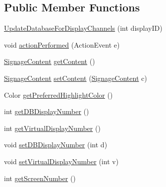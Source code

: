 \subsection*{Public Member Functions}
\begin{DoxyCompactItemize}
\item 
\hyperlink{classgov_1_1fnal_1_1ppd_1_1dd_1_1display_1_1client_1_1UpdateDatabaseForDisplayChannels_a66161ae3d778923070b8e76e261b8919}{Update\-Database\-For\-Display\-Channels} (int display\-I\-D)
\item 
void \hyperlink{classgov_1_1fnal_1_1ppd_1_1dd_1_1display_1_1client_1_1UpdateDatabaseForDisplayChannels_afca6ea4cce3f74bfb0234d7a64df3128}{action\-Performed} (Action\-Event e)
\item 
\hyperlink{interfacegov_1_1fnal_1_1ppd_1_1dd_1_1signage_1_1SignageContent}{Signage\-Content} \hyperlink{classgov_1_1fnal_1_1ppd_1_1dd_1_1display_1_1client_1_1UpdateDatabaseForDisplayChannels_ad4db53bb973088f68a06f874256e4225}{get\-Content} ()
\item 
\hyperlink{interfacegov_1_1fnal_1_1ppd_1_1dd_1_1signage_1_1SignageContent}{Signage\-Content} \hyperlink{classgov_1_1fnal_1_1ppd_1_1dd_1_1display_1_1client_1_1UpdateDatabaseForDisplayChannels_a6fd26afda65661aeed0154a9985e3225}{set\-Content} (\hyperlink{interfacegov_1_1fnal_1_1ppd_1_1dd_1_1signage_1_1SignageContent}{Signage\-Content} c)
\item 
Color \hyperlink{classgov_1_1fnal_1_1ppd_1_1dd_1_1display_1_1client_1_1UpdateDatabaseForDisplayChannels_a0935cd1139a69a4a554edf57dba26879}{get\-Preferred\-Highlight\-Color} ()
\item 
int \hyperlink{classgov_1_1fnal_1_1ppd_1_1dd_1_1display_1_1client_1_1UpdateDatabaseForDisplayChannels_a33565e806ad51bbfd459d1aded545e6a}{get\-D\-B\-Display\-Number} ()
\item 
int \hyperlink{classgov_1_1fnal_1_1ppd_1_1dd_1_1display_1_1client_1_1UpdateDatabaseForDisplayChannels_ad84614dc11788234e7f7dfedde8506dc}{get\-Virtual\-Display\-Number} ()
\item 
void \hyperlink{classgov_1_1fnal_1_1ppd_1_1dd_1_1display_1_1client_1_1UpdateDatabaseForDisplayChannels_a316be5caadb9b6d95d4e7c3264472da1}{set\-D\-B\-Display\-Number} (int d)
\item 
void \hyperlink{classgov_1_1fnal_1_1ppd_1_1dd_1_1display_1_1client_1_1UpdateDatabaseForDisplayChannels_a20deb9f5431d716492d8af09ee38683d}{set\-Virtual\-Display\-Number} (int v)
\item 
int \hyperlink{classgov_1_1fnal_1_1ppd_1_1dd_1_1display_1_1client_1_1UpdateDatabaseForDisplayChannels_a14bd3dcb4e49bcba64ee0dcfc0be9cc7}{get\-Screen\-Number} ()

\end{DoxyCompactItemize}
